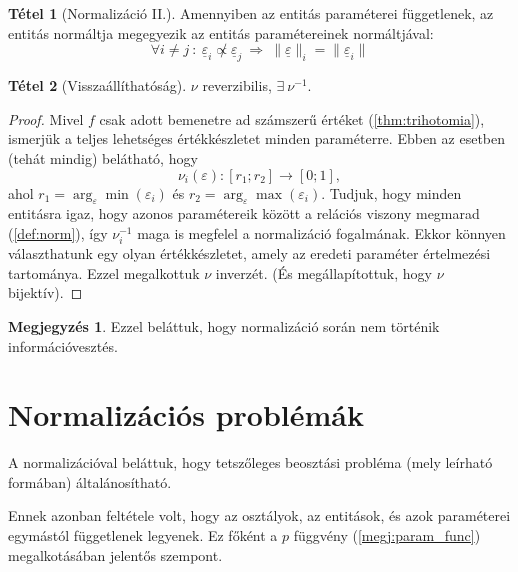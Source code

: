 \documentclass[twocolumn]{article}
\theoremstyle{definition}
\newtheorem{theorem}{Tétel}[section]
\newtheorem*{megj}{Megjegyzés}
\newcommand{\vect}[1]{ \underline{#1} }
\newcommand{\norm}[1]{ \parallel {#1} \parallel }
\begin{document}
    \begin{theorem}[Normalizáció II.]
        Amennyiben az entitás paraméterei függetlenek, az entitás normáltja megegyezik az entitás paramétereinek normáltjával:
        \begin{equation}
            \forall i \neq j \ : \ 
            \vect\varepsilon_i \not \propto \vect\varepsilon_j 
            \ \Longrightarrow \
            \norm{\vect\varepsilon}_i = \norm{\vect\varepsilon_i}
        \end{equation}
    \end{theorem}
    
    \begin{theorem}[Visszaállíthatóság]
        $\nu$ reverzibilis, $\exists \ \nu^{-1}$.
        
        \begin{proof}
            Mivel $f$ csak adott bemenetre ad számszerű értéket (\ref{thm:trihotomia}), ismerjük a teljes lehetséges értékkészletet minden paraméterre. Ebben az esetben (tehát mindig) belátható, hogy 
            $$ \nu_i(\varepsilon) : [r_1; r_2] \to [0; 1], $$
            ahol $r_1 = \arg_\varepsilon\min(\varepsilon_i)$ és $r_2 = \arg_\varepsilon\max(\varepsilon_i)$.
            Tudjuk, hogy minden entitásra igaz, hogy azonos paramétereik között a relációs viszony megmarad (\ref{def:norm}), így $\nu_i^{-1}$ maga is megfelel a normalizáció fogalmának. Ekkor könnyen választhatunk egy olyan értékkészletet, amely az eredeti paraméter értelmezési tartománya. Ezzel megalkottuk $\nu$ inverzét. (És megállapítottuk, hogy $\nu$ bijektív).
        \end{proof}
        \begin{megj}
            Ezzel beláttuk, hogy normalizáció során nem történik információvesztés.
        \end{megj}
    \end{theorem}
    
\section{Normalizációs problémák}
    A normalizációval beláttuk, hogy tetszőleges beosztási probléma (mely leírható \az{(\ref{def:problema})} formában) általánosítható. 
    
    Ennek azonban feltétele volt, hogy az osztályok, az entitások, és azok paraméterei egymástól függetlenek legyenek. Ez főként a $p$ függvény (\ref{megj:param_func}) megalkotásában jelentős szempont.
    
\end{document}
